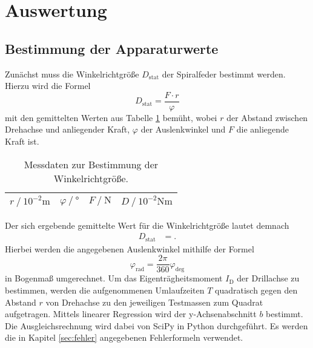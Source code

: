 \section{Auswertung}
\label{sec:Auswertung}

\subsection{Bestimmung der Apparaturwerte}

Zunächst muss die Winkelrichtgröße $D_\text{stat}$ der Spiralfeder bestimmt werden.
Hierzu wird die Formel
\begin{equation}
  D_\text{stat} = \frac{F \cdot r}{\varphi}
\end{equation}
mit den gemittelten Werten aus Tabelle \ref{tab:1} bemüht, wobei $r$ der Abstand zwischen Drehachse und anliegender Kraft, $\varphi$ der Auslenkwinkel und $F$ die anliegende Kraft ist.

\begin{table}[H]
  \centering
  \caption{Messdaten zur Bestimmung der Winkelrichtgröße.}
  \label{tab:1}
  \begin{tabular}{c c c c}
    \toprule
    {$r \ /\ 10^{-2}\si{\metre}$} & {$\varphi \ /\ \si{\degree}$} & {$F \ /\ \si{\newton}$} & {$D \ /\ 10^{-2}\si{\newton\metre}$}\\
    \midrule
    
    \bottomrule
  \end{tabular}
\end{table}

Der sich ergebende gemittelte Wert für die Winkelrichtgröße lautet demnach
\begin{align*}
  D_\text{stat}   &=   .
\end{align*}
Hierbei werden die angegebenen Auslenkwinkel mithilfe der Formel
\begin{equation}
  \varphi_\text{rad} = \frac{2 \pi}{360} \varphi_\text{deg}
\end{equation}
in Bogenmaß umgerechnet.
Um das Eigenträgheitsmoment $I_{\text{D}}$ der Drillachse zu bestimmen, werden die aufgenommenen Umlaufzeiten $T$ quadratisch gegen den Abstand $r$ von Drehachse zu den jeweiligen Testmassen zum Quadrat aufgetragen.
Mittels linearer Regression wird der y-Achsenabschnitt $b$ bestimmt.
Die Ausgleichsrechnung wird dabei von SciPy in Python durchgeführt.
Es werden die in Kapitel \ref{sec:fehler} angegebenen Fehlerformeln verwendet.


